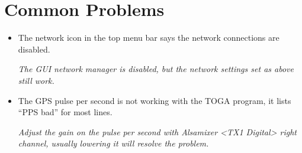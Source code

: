 \section{Common Problems}

\begin{itemize}
\item The network icon in the top menu bar says the network connections are disabled.

\emph{The GUI network manager is disabled, but the network settings set as above still work.}

\item The GPS pulse per second is not working with the TOGA program, it lists ``PPS bad'' for most lines.

\emph{Adjust the gain on the pulse per second with Alsamixer <TX1 Digital> right channel, usually lowering it will resolve the problem.}

\end{itemize}


